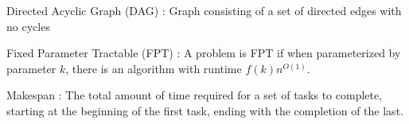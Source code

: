 Directed Acyclic Graph (DAG) : Graph consisting of a set of directed edges with
no cycles

Fixed Parameter Tractable (FPT) : A problem is FPT if when parameterized by
parameter $k$, there is an algorithm with runtime $f(k) n^{O(1)}$.

Makespan : The total amount of time required for a set of tasks to complete,
starting at the beginning of the first task, ending with the completion of the
last.
